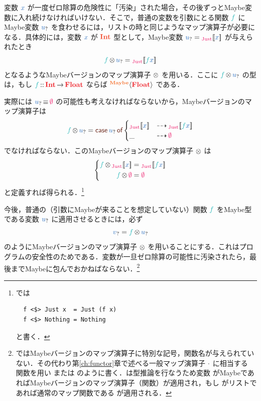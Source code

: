 \documentclass[a5paper,twoside,fleqn,draft]{jsbook}
\begin{document}
変数 $\hVar{x}$ が一度ゼロ除算の危険性に「汚染」された場合，その後ずっとMaybe変数に入れ続けなければいけない．そこで，普通の変数を引数にとる関数 $\hFunc{f}$ にMaybe変数 $\hMaybeVar{u}$ を食わせるには，リストの時と同じようなマップ演算子が必要になる．具体的には，変数 $\hVar{x}$ が $\mType{Int}$ 型として，Maybe変数 $\hMaybeVar{u}=\hJustWith{\hVar{x}}$ が与えられたとき
\begin{equation}
  \hFunc{f}\hMaybeMap\hMaybeVar{u}
  =\hJustWith{\hFunc{f}\hVar{x}}
\end{equation}
となるようなMaybeバージョンのマップ演算子 $\operatorname{\otimes}$ を用いる．ここに $\hFunc{f}\hMaybeMap\hMaybeVar{u}$ の型は，もし $\hFunc{f}\hIsTypeOf\mProjEXP{\hInt}{\hFloat}$ ならば $\hMaybeConstruct{\hFloat}$ である．

実際には $\hMaybeVar{u}\hIfEq\hNothing$ の可能性も考えなければならないから，Maybeバージョンのマップ演算子は
\begin{equation}
  \hFunc{f}\hMaybeMap\hMaybeVar{u}
  =\hCaseSyntax{\hMaybeVar{u}}
  \begin{cases}
    \hJustWith{\hVar{x}}
    &\hIfSo\hJustWith{\hFunc{f}\hVar{x}}\\
    \_
    &\hIfSo\hNothing
  \end{cases}
\end{equation}
でなければならない．このMaybeバージョンのマップ演算子 $\operatorname{\otimes}$ は
\begin{equation}
  \left\{
  \begin{aligned}
    \hFunc{f}\hMaybeMap\hJustWith{\hVar{x}}
    &=\hJustWith{\hFunc{f}\hVar{x}}\\
    \hFunc{f}\hMaybeMap\hNothing
    &=\hNothing
  \end{aligned}
  \right.
\end{equation}
と定義すれば得られる．\footnote{\haskell では
\begin{verbatim}
  f <$> Just x  = Just (f x)
  f <$> Nothing = Nothing
\end{verbatim}
と書く．}

今後，普通の（引数にMaybeが来ることを想定していない）関数 $\hFunc{f}$ をMaybe型である変数 $\hMaybeVar{u}$ に適用させるときには，必ず
\begin{equation}
  \hMaybeVar{v}
  =\hFunc{f}\hMaybeMap\hMaybeVar{u}
\end{equation}
のようにMaybeバージョンのマップ演算子 $\operatorname{\otimes}$ を用いることにする．これはプログラムの安全性のためである．変数が一旦ゼロ除算の可能性に汚染されたら，最後までMaybeに包んでおかねばならない．\footnote{\haskell ではMaybeバージョンのマップ演算子に特別な記号，関数名が与えられていない．その代わり第\ref{ch:functor}章で述べる一般マップ演算子 $\operatorname{\cdot}$ に相当する  関数を用い  または  のように書く．\haskell は型推論を行なうため変数  がMaybeであればMaybeバージョンのマップ演算子（関数）が適用され，もし  がリストであれば通常のマップ関数である  が適用される．} %
\end{document}
